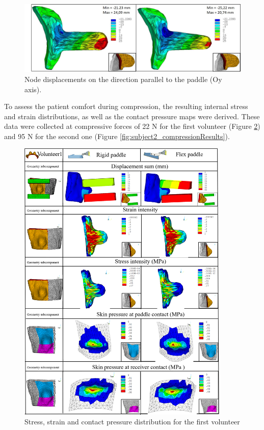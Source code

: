 \begin{figure}[!h]
\centering
\includegraphics[width=1\textwidth,keepaspectratio]{figures/rigid_flex_y_displacement.jpg} 
\caption{Node displacements on the direction parallel to the paddle (Oy axis).}\label{fig:rigid_flex_y_displacement}
\end{figure}

To assess the patient comfort during compression, the resulting internal stress and strain distributions, as well as the contact pressure maps were derived. These data were collected at compressive forces of 22 N for the first volunteer (Figure \ref{fig:subject1_compressionResults}) and 95 N for the second one (Figure \ref{fig:subject2_compressionResults}).

\begin{figure}[h!]
\centering
\includegraphics[width=0.9\textwidth,keepaspectratio]{figures/subject1_compressionResults.png} 
\caption{Stress, strain and contact pressure distribution for the first volunteer}\label{fig:subject1_compressionResults}
\end{figure}

